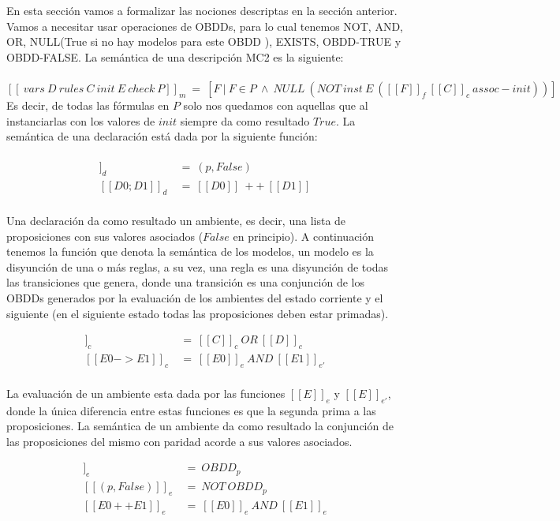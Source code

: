 En esta sección vamos a formalizar las nociones descriptas en la sección anterior. Vamos a necesitar usar operaciones de OBDDs, para lo cual tenemos NOT, AND, OR, NULL(True si no hay modelos para este OBDD \cite{Waldmann:6} ), EXISTS, OBDD-TRUE y OBDD-FALSE. La semántica de una descripción MC2 es la siguiente:\\
\\
$[[\ vars\ D\ rules\ C\ init\ E\ check\ P ]]_{m}\ =\ [F\ |\ F \in P\ \land\ NULL\ (NOT\ inst\ E\ ([[F]]_{f}\ [[C]]_{c}\ assoc-init))]$ \\

Es decir, de todas las fórmulas en $P$ solo nos quedamos con aquellas que al instanciarlas con los valores de $init$ siempre da como resultado $True$. La semántica de una declaración está dada por la siguiente función: \\
\\
\begin{align*}
[[p]]_{d}\ &=\ (p,False) \\
[[D0;D1]]_{d}\ &=\ [[D0]]\ ++\ [[D1]] \\
\end{align*}

Una declaración da como resultado un ambiente, es decir, una lista de proposiciones con sus valores asociados ($False$ en principio). A continuación tenemos la función que denota la semántica de los modelos, un modelo es la disyunción de una o más reglas, a su vez, una regla es una disyunción de todas las transiciones que genera, donde una transición es una conjunción de los OBDDs generados por la evaluación de los ambientes del estado corriente y el siguiente (en el siguiente estado todas las proposiciones deben estar primadas).

\begin{align*}
[[C;D]]_{c}\ &=\ [[C]]_{c}\ OR\ [[D]]_{c} \\
[[E0->E1]]_{c}\ &=\ [[E0]]_{e}\ AND\ [[E1]]_{e'} \\
\end{align*}

La evaluación de un ambiente esta dada por las funciones $[[E]]_{e}$ y $[[E]]_{e'}$, donde la única diferencia entre estas funciones es que la segunda prima a las proposiciones. La semántica de un ambiente da como resultado la conjunción de las proposiciones del mismo con paridad acorde a sus valores asociados.

\begin{align*}
[[(p,True)]]_{e}\ &=\ OBDD_{p} \\
[[(p,False)]]_{e}\ &=\ NOT\ OBDD_{p} \\
[[E0++E1]]_{e}\ &=\ [[E0]]_{e}\ AND\ [[E1]]_{e} \\
\end{align*}

